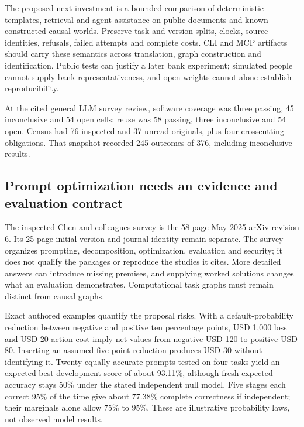 The proposed next investment is a bounded comparison of deterministic
templates, retrieval and agent assistance on public documents and known
constructed causal worlds. Preserve task and version splits, clocks,
source identities, refusals, failed attempts and complete costs. CLI and
MCP artifacts should carry these semantics across translation, graph
construction and identification. Public tests can justify a later bank
experiment; simulated people cannot supply bank representativeness, and
open weights cannot alone establish reproducibility.

At the cited general LLM survey review, software coverage was three
passing, 45 inconclusive and 54 open cells; reuse was 58 passing, three
inconclusive and 54 open. Census had 76 inspected and 37 unread
originals, plus four crosscutting obligations. That snapshot recorded
245 outcomes of 376, including inconclusive results.
\citep{sp24llmchallenges_reader,sp24llmchallenges_progress}

\hypertarget{prompt-optimization-needs-an-evidence-and-evaluation-contract}{%
\subsection{Prompt optimization needs an evidence and evaluation
contract}\label{prompt-optimization-needs-an-evidence-and-evaluation-contract}}

The inspected Chen and colleagues survey is the 58-page May 2025 arXiv
revision 6. Its 25-page initial version and journal identity remain
separate. The survey organizes prompting, decomposition, optimization,
evaluation and security; it does not qualify the packages or reproduce
the studies it cites. More detailed answers can introduce missing
premises, and supplying worked solutions changes what an evaluation
demonstrates. Computational task graphs must remain distinct from causal
graphs.\citep{exec24_promptengineering_original}

Exact authored examples quantify the proposal risks. With a
default-probability reduction between negative and positive ten
percentage points, USD 1,000 loss and USD 20 action cost imply net
values from negative USD 120 to positive USD 80. Inserting an assumed
five-point reduction produces USD 30 without identifying it. Twenty
equally accurate prompts tested on four tasks yield an expected best
development score of about 93.11\%, although fresh expected accuracy
stays 50\% under the stated independent null model. Five stages each
correct 95\% of the time give about 77.38\% complete correctness if
independent; their marginals alone allow 75\% to 95\%. These are
illustrative probability laws, not observed model
results.\citep{exec24_promptengineering_reference}

